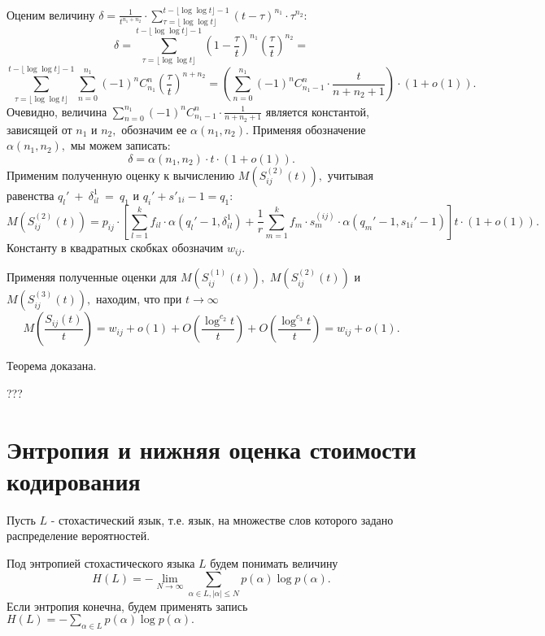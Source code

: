 \documentclass[12pt,russian]{article}
\begin{document}
{Оценим величину
$
\delta=\frac{1}{t^{n_1+n_2}}\cdot \sum_{\tau=\lfloor \log\log t \rfloor}^{t-\lfloor \log\log t \rfloor-1}
(t-\tau)^{n_1}\cdot \tau^{n_2}:
$ 
$$
\delta=
\sum_{\tau=\lfloor \log\log t \rfloor}^{t-\lfloor \log\log t \rfloor-1} \left(1-\frac{\tau}{t}\right)^{n_1} \left(\frac{\tau}{t}\right)^{n_2}=
$$
$$
\sum_{\tau=\lfloor \log\log t \rfloor}^{t-\lfloor \log\log t \rfloor-1} 
\sum_{n=0}^{n_1} (-1)^{n} C_{n_1}^n \left( \frac{\tau}{t} \right)^{n+n_2} =
\left(\sum_{n=0}^{n_1} (-1)^{n} C_{n_1-1}^n \cdot \frac{t}{n+n_2+1}  \right)\cdot (1+o(1)).
$$
Очевидно, величина $\sum_{n=0}^{n_1} (-1)^{n} C_{n_1-1}^n \cdot \frac{1}{n+n_2+1}$ является константой, зависящей от $n_1$ и $n_2,$ обозначим ее $\alpha(n_1,n_2)$.
Применяя обозначение $\alpha(n_1,n_2),$ мы можем записать:
$$
\delta=\alpha(n_1,n_2)\cdot t\cdot (1+o(1)).
$$
Применим полученную оценку к вычислению $M\left(S_{ij}^{(2)}(t)\right),$ учитывая равенства 
$q_l'~+~\delta_{il}^1~=~q_1$ и $q_i'+s'_{1i}-1=q_1:$
$$
M\left(S_{ij}^{(2)}(t)\right)=p_{ij}\cdot
\left[\sum_{l =1}^k f_{il} \cdot \alpha(q_l'-1,\delta_{il}^1)+ 
\frac{1}{{r }} \sum_{m=1}^k f_m\cdot s_m^{(ij)}\cdot
\alpha(q_m'-1,s_{1i}'-1)\right]t \cdot(1+o(1)).
$$
Константу в квадратных скобках обозначим $w_{ij}.$

Применяя полученные оценки для $M\left(S_{ij}^{(1)}(t)\right),$
$M\left(S_{ij}^{(2)}(t)\right)$ и
$M\left(S_{ij}^{(3)}(t)\right),$ находим, что при $t \rightarrow \infty$
$$
M\left(\frac{S_{ij}(t)}{t}\right)=w_{ij}+o(1)+
O\left(\frac{\log^{c_2} t}{t}\right) +
O\left(\frac{\log ^{c_3} t}{t}\right)=w_{ij}+o(1).
$$

Теорема доказана.

\medskip
???

\section {
Энтропия и нижняя оценка стоимости кодирования}

Пусть $L$ - стохастический язык, т.е. язык, на множестве слов которого задано распределение вероятностей.

Под энтропией стохастического языка $L$ будем понимать величину
$$
H(L)=-\lim_{N \rightarrow \infty} \sum_{\alpha \in L, \left|\alpha\right|\le N} p(\alpha) \log p(\alpha).
$$
Если энтропия конечна, будем применять запись $H(L)=-\sum_{\alpha \in L} p(\alpha) \log p(\alpha).$

}
\end{document}
